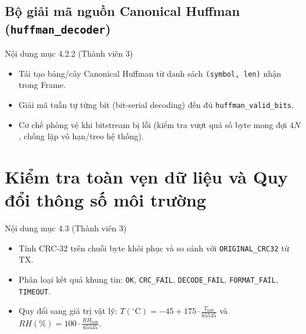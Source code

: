 \documentclass[12pt,a4paper]{report}
\begin{document}
\subsection{Bộ giải mã nguồn Canonical Huffman (\texttt{huffman\_decoder})}
\begin{notebox}{Nội dung mục 4.2.2 (Thành viên 3)}
\begin{itemize}[leftmargin=*,nosep]
    \item Tái tạo bảng/cây Canonical Huffman từ danh sách \texttt{(symbol, len)} nhận trong Frame.
    \item Giải mã tuần tự từng bit (bit-serial decoding) đến đủ \texttt{huffman\_valid\_bits}.
    \item Cơ chế phòng vệ khi bitstream bị lỗi (kiểm tra vượt quá số byte mong đợi $4N$, chống lặp vô hạn/treo hệ thống).
\end{itemize}
\end{notebox}

\section{Kiểm tra toàn vẹn dữ liệu và Quy đổi thông số môi trường}
\begin{notebox}{Nội dung mục 4.3 (Thành viên 3)}
\begin{itemize}[leftmargin=*,nosep]
    \item Tính CRC-32 trên chuỗi byte khôi phục và so sánh với \texttt{ORIGINAL\_CRC32} từ TX.
    \item Phân loại kết quả khung tin: \texttt{OK}, \texttt{CRC\_FAIL}, \texttt{DECODE\_FAIL}, \texttt{FORMAT\_FAIL}, \texttt{TIMEOUT}.
    \item Quy đổi sang giá trị vật lý: $T(^\circ\text{C}) = -45 + 175 \cdot \frac{T_{\text{raw}}}{65535}$ và $RH(\%) = 100 \cdot \frac{RH_{\text{raw}}}{65535}$.
\end{itemize}
\end{notebox}
\end{document}
